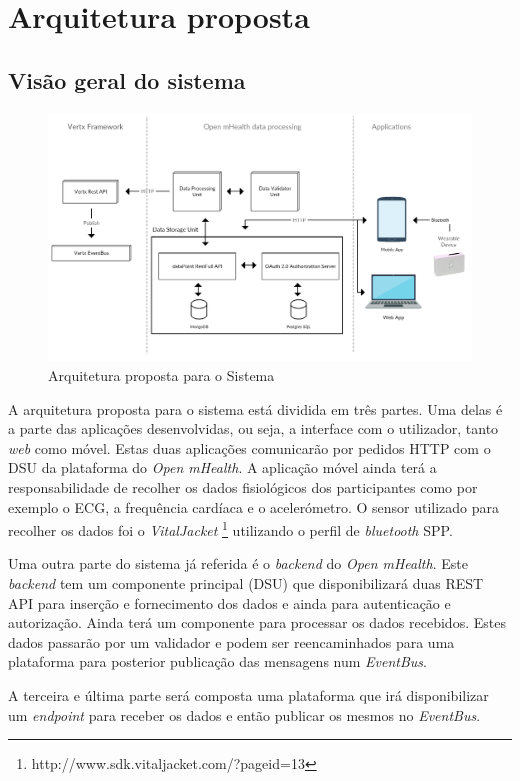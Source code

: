 \chapter{Arquitetura proposta}

\section{Visão geral do sistema}

\begin{figure}[H]
  \centering
  \includegraphics[width=1\textwidth]{imgs/arch-product.png}
  \caption[Arquitetura proposta para o Sistema]{Arquitetura proposta para o Sistema}
  
  \label{f:product-arch}
\end{figure}

A arquitetura proposta para o sistema está dividida em três partes. Uma delas é a parte das aplicações desenvolvidas, ou seja, a interface com o utilizador, tanto \textit{web} como móvel. Estas duas aplicações comunicarão por pedidos \gls{HTTP} com o \gls{DSU} da plataforma do \textit{Open mHealth}. A aplicação móvel ainda terá a responsabilidade de recolher os dados fisiológicos dos participantes como por exemplo o \gls{ECG}, a frequência cardíaca e o acelerómetro. O sensor utilizado para recolher os dados foi o \textit{VitalJacket} \footnote{http://www.sdk.vitaljacket.com/?pageid=13} utilizando o perfil de \textit{bluetooth} \gls{SPP}.
\par 
Uma outra parte do sistema já referida é o \textit{backend} do \textit{Open mHealth}. Este \textit{backend} tem um componente principal (\gls{DSU}) que disponibilizará duas \gls{REST} \gls{API} para inserção e fornecimento dos dados e ainda para autenticação e autorização. Ainda terá um componente para processar os dados recebidos. Estes dados passarão por um validador e podem ser reencaminhados para uma plataforma para posterior publicação das mensagens num \textit{EventBus}.
\par
A terceira e última parte será composta uma plataforma que irá disponibilizar um \textit{endpoint} para receber os dados e então publicar os mesmos no \textit{EventBus}.







